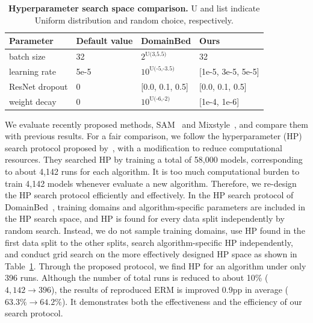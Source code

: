 \begin{table}[h]
\centering
\caption{\small\textbf{Hyperparameter search space comparison.} U and list indicate Uniform distribution and random choice, respectively.}
\label{table:hp_search_protocol}
\begin{tabular}{llll} 
\toprule
\textbf{Parameter} & \textbf{Default value} & \textbf{DomainBed}            & \textbf{Ours}                  \\
\midrule
batch size         & 32                     & $2^\text{U(3,5.5)}$           & 32                             \\
learning rate      & 5e-5                & $10^\text{U(-5,-3.5)}$        & [1e-5, 3e-5, 5e-5]  \\
ResNet dropout     & 0                      & [0.0, 0.1, 0.5] & [0.0, 0.1, 0.5]  \\
weight decay       & 0                      & $10^\text{U(-6,-2)}$          & [1e-4, 1e-6]                 \\
\bottomrule
\end{tabular}
\end{table}

We evaluate recently proposed methods, SAM~\cite{foret2020sharpness} and Mixstyle~\cite{zhou2021mixstyle}, and compare them with previous results. For a fair comparison, we follow the hyperparameter (HP) search protocol proposed by~\citet{gulrajani2020domainbed}, with a modification to reduce computational resources.
They searched HP by training a total of 58,000 models, corresponding to about 4,142 runs for each algorithm.
It is too much computational burden to train 4,142 models whenever evaluate a new algorithm.
Therefore, we re-design the HP search protocol efficiently and effectively. In the HP search protocol of DomainBed~\cite{gulrajani2020domainbed}, training domains and algorithm-specific parameters are included in the HP search space, and HP is found for every data split independently by random search. Instead, we do not sample training domains, use HP found in the first data split to the other splits, search algorithm-specific HP independently, and conduct grid search on the more effectively designed HP space as shown in Table~\ref{table:hp_search_protocol}. Through the proposed protocol, we find HP for an algorithm under only 396 runs. Although the number of total runs is reduced to about 10\% ($4,142 \rightarrow 396$), the results of reproduced ERM is improved 0.9pp in average ($63.3\% \rightarrow 64.2\%$). It demonstrates both the effectiveness and the efficiency of our search protocol.

